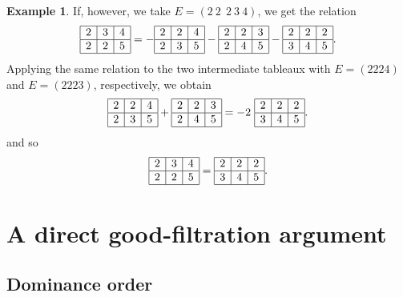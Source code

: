 \documentclass[10pt]{amsart}
\theoremstyle{definition}
\newtheorem*{example}{Example}
\theoremstyle{remark}
\begin{document}
\begin{example}
If, however, we take $E=(2\ 2 \ \ 2\ 3\ 4)$, we get the relation  
 \[
\begin{array}{|c|c|c|}
\hline
2&3&4\\ \hline
2&2&5\\ \hline
\end{array}
=-
\begin{array}{|c|c|c|}
\hline
2&2&4\\ \hline
2&3&5\\ \hline
\end{array}
-
\begin{array}{|c|c|c|}
\hline
2&2&3\\ \hline
2&4&5\\ \hline
\end{array}
-
\begin{array}{|c|c|c|}
\hline
2&2&2\\ \hline
3&4&5\\ \hline
\end{array}
 .\]
Applying the same relation to the two intermediate tableaux with $E=(2224)$ and $E=(2223)$, respectively, we obtain 
\[
\begin{array}{|c|c|c|}
\hline
2&2&4\\ \hline
2&3&5\\ \hline
\end{array}+
\begin{array}{|c|c|c|}
\hline
2&2&3\\ \hline
2&4&5\\ \hline
\end{array}=-2\ \begin{array}{|c|c|c|}
\hline
2&2&2\\ \hline
3&4&5\\ \hline
\end{array}
.\]
and so 
\[\begin{array}{|c|c|c|}
\hline
2&3&4\\ \hline
2&2&5\\ \hline \end{array}
=\begin{array}{|c|c|c|}
\hline
2&2&2\\ \hline
3&4&5\\ \hline \end{array}.\]

\end{example}
 
 
 
 
  

\section{A direct good-filtration argument}
\label{sec:direct-good-filtration}\subsection{Dominance  order}
\end{document}
